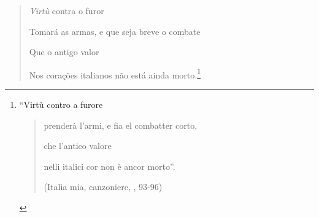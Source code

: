 \begin{quote}
\emph{Virtù} contra o furor

Tomará as armas, e que seja breve o combate

Que o antigo valor

Nos corações italianos não está ainda morto.\footnote{``Virtù contro a
  furore

  \begin{quote}
  prenderà l'armi, e fia el combatter corto,

  che l'antico valore

  nelli italici cor non è ancor morto''.

  (Italia mia, canzoniere, , 93-96)
  \end{quote}}
\end{quote}